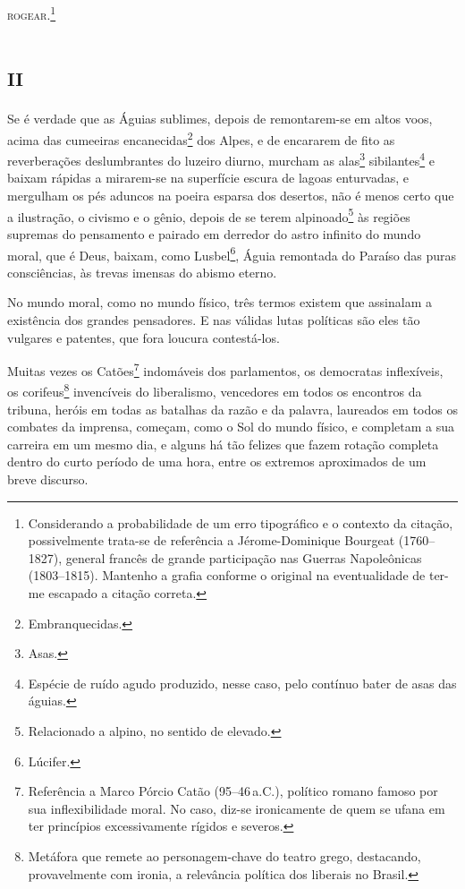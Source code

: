 \textsc{rogear}.\footnote{Considerando a probabilidade de um erro tipográfico e
  o contexto da citação, possivelmente trata-se de referência a
  Jérome-Dominique Bourgeat (1760--1827), general francês de grande
  participação nas Guerras Napoleônicas (1803--1815). Mantenho a grafia
  conforme o original na eventualidade de ter-me escapado a citação
  correta.\label{rogear}}

\section{\textsc{ii}}

Se é verdade que as Águias sublimes, depois de remontarem-se em altos
voos, acima das cumeeiras encanecidas\footnote{Embranquecidas.} dos
Alpes, e de encararem de fito as reverberações deslumbrantes do luzeiro
diurno, murcham as alas\footnote{Asas.} sibilantes\footnote{Espécie
  de ruído agudo produzido, nesse caso, pelo contínuo bater de asas das
  águias.} e baixam rápidas a mirarem-se na superfície escura de lagoas
enturvadas, e mergulham os pés aduncos na poeira esparsa dos desertos,
não é menos certo que a ilustração, o civismo e o gênio, depois de se
terem alpinoado\footnote{Relacionado a alpino, no sentido de elevado.}
às regiões supremas do pensamento e pairado em derredor do astro
infinito do mundo moral, que é Deus, baixam, como Lusbel\footnote{Lúcifer.}, 
Águia remontada do Paraíso das puras consciências, às
trevas imensas do abismo eterno.

No mundo moral, como no mundo físico, três termos existem que assinalam
a existência dos grandes pensadores. E nas válidas lutas políticas são
eles tão vulgares e patentes, que fora loucura contestá-los.

Muitas vezes os Catões\footnote{Referência a Marco Pórcio Catão (95--46\,a.C.), 
político romano famoso por sua inflexibilidade moral. No
  caso, diz-se ironicamente de quem se ufana em ter princípios
  excessivamente rígidos e severos.\label{marco}} indomáveis dos parlamentos, os
democratas inflexíveis, os corifeus\footnote{Metáfora que remete ao
  personagem-chave do teatro grego, destacando, provavelmente com
  ironia, a relevância política dos liberais no Brasil.} invencíveis do
liberalismo, vencedores em todos os encontros da tribuna, heróis em
todas as batalhas da razão e da palavra, laureados em todos os combates
da imprensa, começam, como o Sol do mundo físico, e completam a sua
carreira em um mesmo dia, e alguns há tão felizes que fazem rotação
completa dentro do curto período de uma hora, entre os extremos
aproximados de um breve discurso.

